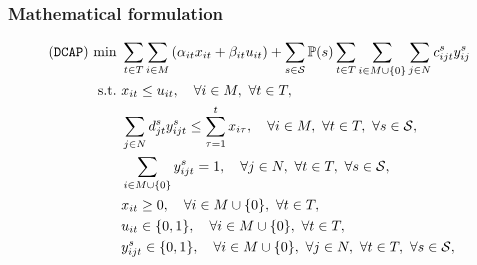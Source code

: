 \subsubsection{Mathematical formulation}
\begin{subequations}
	\begin{align}
	(\texttt{DCAP})\ \textrm{min}\ &\sum_{t\in T}\sum_{i\in M}\left(\alpha_{it}x_{it}+\beta_{it}u_{it}\right)+\sum_{s\in\mathcal{S}}\PP(s)\sum_{t\in T}\sum_{i\in M\cup\{0\}}\sum_{j\in N}c_{ijt}^{s}y_{ij}^s\\
	\textrm{s.t.}\ &x_{it}\le u_{it},\quad\forall i\in M,\ \forall t\in T,\\
	&\sum_{j\in N}d_{jt}^s y_{ijt}^s\le\sum_{\tau=1}^{t}x_{i\tau},\quad\forall i\in M,\ \forall t\in T,\ \forall s\in\mathcal{S},\\
	&\sum_{i\in M\cup \{0\}}y_{ijt}^s=1,\quad\forall j\in N,\ \forall t\in T,\ \forall s\in\mathcal{S}, \\
	&x_{it}\ge 0,\quad\forall i\in M\cup\{0\},\ \forall t\in T,\\
	&u_{it}\in\{0,1\}, \quad\forall i\in M\cup\{0\},\ \forall t\in T,\\
	&y_{ijt}^s\in\{0,1\},\quad\forall i\in M\cup\{0\},\ \forall j\in N,\ \forall t\in T,\ \forall s\in\mathcal{S},
	\end{align}
\end{subequations}


